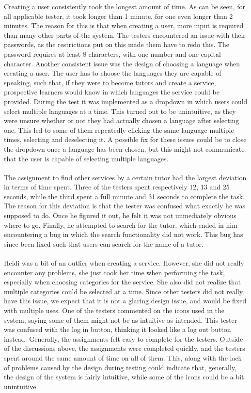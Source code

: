 Creating a user consistently took the longest amount of time.
As can be seen, for all applicable tester, it took longer than 1 minute, for one even longer than 2 minutes.
The reason for this is that when creating a user, more input is required than many other parts of the system.
The testers encountered an issue with their passwords, as the restrictions put on this made them have to redo this.
The password requires at least 8 characters, with one number and one capital character.
Another consistent issue was the design of choosing a language when creating a user.
The user has to choose the languages they are capable of speaking, such that, if they were to become tutors and create a service, prospective learners would know in which languages the service could be provided.
During the test it was implemented as a dropdown in which users could select multiple languages at a time.
This turned out to be unintuitive, as they were unsure whether or not they had actually chosen a language after selecting one.
This led to some of them repeatedly clicking the same language multiple times, selecting and deselecting it.
A possible fix for these issues could be to close the dropdown once a language has been chosen, but this might not communicate that the user is capable of selecting multiple languages.
\\\\
The assignment to find other services by a certain tutor had the largest deviation in terms of time spent.
Three of the testers spent respectively 12, 13 and 25 seconds, while the third spent a full minute and 31 seconds to complete the task.
The reason for this deviation is that the tester was confused what exactly he was supposed to do.
Once he figured it out, he felt it was not immediately obvious where to go.
Finally, he attempted to search for the tutor, which ended in him encountering a bug in which the search functionality did not work.
This bug has since been fixed such that users can search for the name of a tutor.
\\\\
Heidi was a bit of an outlier when creating a service.
However, she did not really encounter any problems, she just took her time when performing the task, especially when choosing categories for the service.
She also did not realize that multiple categories could be selected at a time.
Since other testers did not really have this issue, we expect that it is not a glaring design issue, and would be fixed with multiple uses.
One of the testers commented on the icons used in the system, saying some of them might not be as intuitive as intended.
This tester was confused with the log in button, thinking it looked like a log out button instead.
Generally, the assignments felt easy to complete for the testers.
Outside of the discussions above, the assignments were completed quickly, and the testers spent around the same amount of time on all of them.
This, along with the lack of problems caused by the design during testing could indicate that, generally, the design of the system is fairly intuitive, while some of the icons could be a bit unintuitive. 

